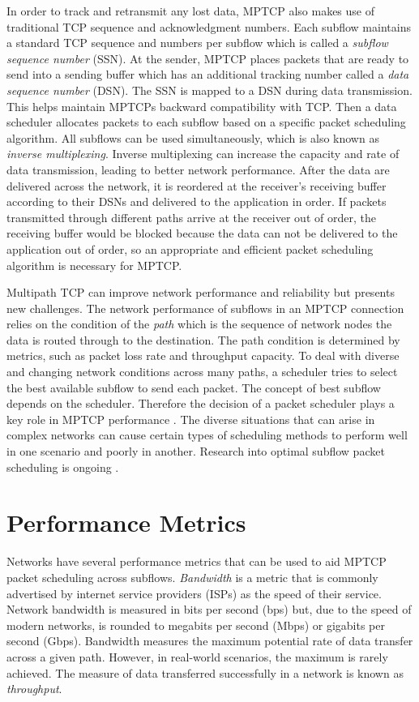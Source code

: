 \documentclass[sigplan,screen,nonacm]{acmart}
\begin{document}
In order to track and retransmit any lost data, MPTCP also makes use of traditional TCP sequence and acknowledgment numbers. Each subflow maintains a standard TCP sequence and numbers per subflow which is called a \emph{subflow sequence number} (SSN). At the sender, MPTCP places packets that are ready to send into a sending buffer which has an additional tracking number called a \emph{data sequence number} (DSN). The SSN is mapped to a DSN during data transmission. This helps maintain MPTCPs backward compatibility with TCP. Then a data scheduler allocates packets to each subflow based on a specific packet scheduling algorithm. All subflows can be used simultaneously, which is also known as \emph{inverse multiplexing}. Inverse multiplexing can increase the capacity and rate of data transmission, leading to better network performance. After the data are delivered across the network, it is reordered at the receiver’s receiving buffer according to their DSNs and delivered to the application in order. If packets transmitted through different paths arrive at the receiver out of order, the receiving buffer would be blocked because the data can not be delivered to the application out of order, so an appropriate and efficient packet scheduling algorithm is necessary for MPTCP.

Multipath TCP can improve network performance and reliability but presents new challenges. The network performance of subflows in an MPTCP connection relies on the condition of the \emph{path} which is the sequence of network nodes the data is routed through to the destination. The path condition is determined by metrics, such as packet loss rate and throughput capacity. To deal with diverse and changing network conditions across many paths, a scheduler tries to select the best available subflow to send each packet. The concept of best subflow depends on the scheduler. Therefore the decision of a packet scheduler plays a key role in MPTCP performance \cite{PacketSchedulingServe:2018}. The diverse situations that can arise in complex networks can cause certain types of scheduling methods to perform well in one scenario and poorly in another. Research into optimal subflow packet scheduling is ongoing \cite{PacketSchedulingServe:2018}.

\section{Performance Metrics}
\label{sec:metrics}
Networks have several performance metrics that can be used to aid MPTCP packet scheduling across subflows. \emph{Bandwidth} is a metric that is commonly advertised by internet service providers (ISPs) as the speed of their service. Network bandwidth is measured in bits per second (bps) but, due to the speed of modern networks, is rounded to megabits per second (Mbps) or gigabits per second (Gbps). Bandwidth measures the maximum potential rate of data transfer across a given path. However, in real-world scenarios, the maximum is rarely achieved. The measure of data transferred successfully in a network is known as \emph{throughput}.
\end{document}
